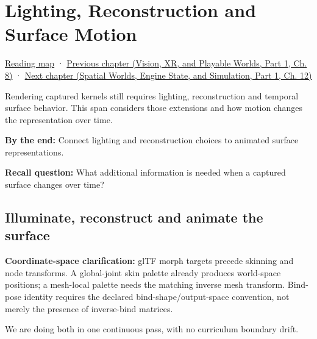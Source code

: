 \chapter{Lighting, Reconstruction and Surface Motion}\label{04-visual-computing-ii-ch040-lighting-reconstruction-and-surface-motion}\hypertarget{04-visual-computing-ii-ch040}{}\label{stagechapter:04-visual-computing-ii-ch040}

\hypertarget{04-visual-computing-ii-ch040-lighting-reconstruction-and-surface-motion}{}

\hyperref[volume-reading-map]{Reading map} · \href{../07-Vision-XR-and-Playable-Worlds-P01/main.pdf\#nameddest=04-visual-computing-ii-ch039-tiling-ordering-and-compositing-at-scale}{Previous chapter (Vision, XR, and Playable Worlds, Part 1, Ch. 8)} · \href{../05-Spatial-Worlds-Engine-State-and-Simulation-P01/main.pdf\#nameddest=04-visual-computing-ii-ch041-per-vertex-and-per-corner-mesh-attributes}{Next chapter (Spatial Worlds, Engine State, and Simulation, Part 1, Ch. 12)}

Rendering captured kernels still requires lighting, reconstruction and temporal surface behavior. This span considers those extensions and how motion changes the representation over time.

\textbf{By the end:} Connect lighting and reconstruction choices to animated surface representations.

\textbf{Recall question:} What additional information is needed when a captured surface changes over time?

\section{Illuminate, reconstruct and animate the surface}\label{04-visual-computing-ii-ch040-illuminate-reconstruct-and-animate-the-surface}

\hypertarget{04-visual-computing-ii-ch040-illuminate-reconstruct-and-animate-the-surface}{}

\textbf{Coordinate-space clarification:} glTF morph targets precede skinning and node transforms. A global-joint skin palette already produces world-space positions; a mesh-local palette needs the matching inverse mesh transform. Bind-pose identity requires the declared bind-shape/output-space convention, not merely the presence of inverse-bind matrices.

We are doing both in one continuous pass, with no curriculum boundary drift.

